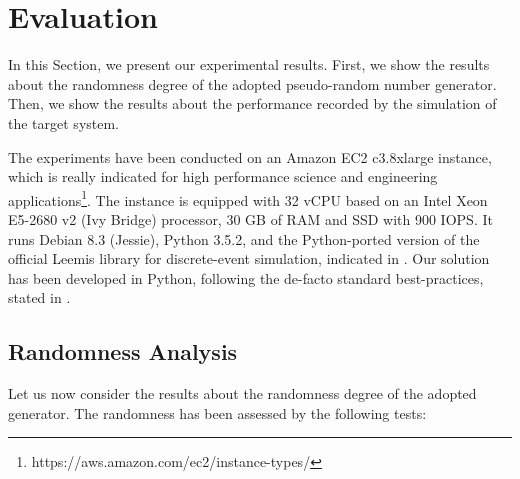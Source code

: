 \section{Evaluation}
\label{sec:evaluation}

In this Section, we present our experimental results.
First, we show the results about the randomness degree of the adopted pseudo-random number generator.
Then, we show the results about the performance recorded by the simulation of the target system.

The experiments have been conducted on an Amazon EC2 c3.8xlarge instance, which is really indicated for high performance science and engineering applications\footnote{https://aws.amazon.com/ec2/instance-types/}.
The instance is equipped with 32 vCPU based on an Intel Xeon E5-2680 v2 (Ivy Bridge) processor, 30 GB of RAM and SSD with 900 IOPS.
It runs Debian 8.3 (Jessie), Python 3.5.2, and the Python-ported version of the official Leemis library for discrete-event simulation, indicated in \cite{leemis2006discrete}.
Our solution has been developed in Python, following the de-facto standard best-practices, stated in \cite{reitz2016,GooglePythonStyleguide}.

\subsection{Randomness Analysis}
\label{sec:evaluation-randomness-analysis}
Let us now consider the results about the randomness degree of the adopted generator.
The randomness has been assessed by the following tests:

